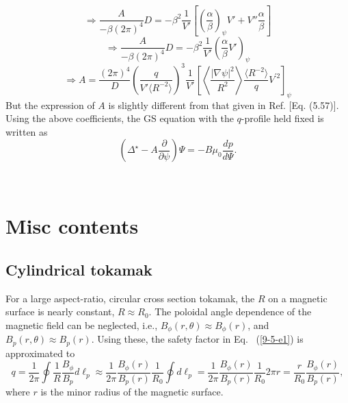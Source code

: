 \documentclass{article}
\begin{document}
\begin{equation}
  \Longrightarrow \frac{A}{- \beta (2 \pi)^4} D = - \beta^2 \frac{1}{V'}
  \left[ \left( \frac{\alpha}{\beta} \right)_{\psi} V' + V''
  \frac{\alpha}{\beta} \right]
\end{equation}
\begin{equation}
  \Longrightarrow \frac{A}{- \beta (2 \pi)^4} D = - \beta^2 \frac{1}{V'}
  \left( \frac{\alpha}{\beta} V' \right)_{\psi}
\end{equation}
\begin{equation}
  \Longrightarrow A = \frac{(2 \pi)^4}{D} \left( \frac{q}{V' \langle R^{- 2}
  \rangle} \right)^3 \frac{1}{V'} \left[ \left\langle \frac{| \nabla \psi
  |^2}{R^2} \right\rangle \frac{\langle R^{- 2} \rangle}{q} V^{\prime 2}
  \right]_{\psi}
\end{equation}
But the expression of $A$ is slightly different from that given in Ref.
{\cite{jardin2010}} [Eq. (5.57)]. Using the above coefficients, the GS
equation with the $q$-profile held fixed is written as
\begin{equation}
  \left( \Delta^{\star} - A \frac{\partial}{\partial \psi} \right) \Psi = - B
  \mu_0 \frac{d p}{d \Psi} .
\end{equation}


\

\section{Misc contents}

\subsection{Cylindrical tokamak}

For a large aspect-ratio, circular cross section tokamak, the $R$ on a
magnetic surface is nearly constant, $R \approx R_0$. The poloidal angle
dependence of the magnetic field can be neglected, i.e., $B_{\phi} (r, \theta)
\approx B_{\phi} (r)$, and $B_p (r, \theta) \approx B_p (r)$. Using these, the
safety factor in Eq. \ (\ref{9-5-e1}) is approximated to
\begin{equation}
  q = \frac{1}{2 \pi} \oint \frac{1}{R} \frac{B_{\phi}}{B_p} d \ell_p \approx
  \frac{1}{2 \pi} \frac{B_{\phi} (r)}{B_p (r)}  \frac{1}{R_0} \oint d \ell_p =
  \frac{1}{2 \pi} \frac{B_{\phi} (r)}{B_p (r)}  \frac{1}{R_0} 2 \pi r =
  \frac{r}{R_0}  \frac{B_{\phi} (r)}{B_p (r)},
\end{equation}
where $r$ is the minor radius of the magnetic surface.
\end{document}
